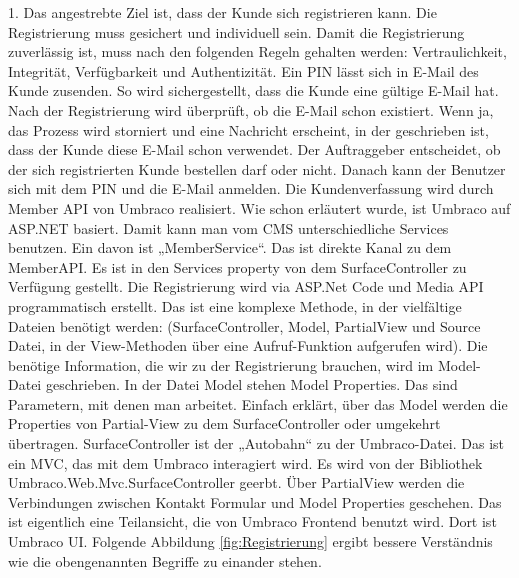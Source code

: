 1. Das angestrebte Ziel ist, dass der Kunde sich registrieren kann. Die Registrierung muss gesichert und individuell sein. Damit die Registrierung zuverlässig ist, muss nach den folgenden Regeln gehalten werden: Vertraulichkeit, Integrität, Verfügbarkeit und Authentizität.
Ein \ac{PIN} lässt sich in E-Mail des Kunde zusenden. So wird sichergestellt, dass die Kunde eine gültige E-Mail hat. Nach der Registrierung wird überprüft, ob die E-Mail schon existiert. Wenn ja, das Prozess wird storniert und eine Nachricht erscheint, in der geschrieben ist, dass der Kunde diese E-Mail schon verwendet. 
Der Auftraggeber entscheidet, ob der sich registrierten Kunde bestellen darf oder nicht. Danach kann der Benutzer sich mit dem PIN und die E-Mail anmelden. 
Die Kundenverfassung wird durch Member \ac{API} von Umbraco realisiert. 
Wie schon erläutert wurde, ist Umbraco auf ASP.NET basiert. Damit kann man vom CMS unterschiedliche Services benutzen. Ein davon ist „MemberService“. Das ist direkte Kanal zu dem MemberAPI. Es ist in den Services\cite{UmbracoHQ2018Services} property von dem SurfaceController \cite{UmbracoHQ2018SurfaceController} zu Verfügung gestellt. 
Die Registrierung wird via ASP.Net Code und Media API programmatisch erstellt. Das ist eine komplexe Methode, in der vielfältige Dateien benötigt werden: (SurfaceController, Model\cite{UmbracoHQ2018Models}, PartialView und Source Datei, in der View-Methoden über eine Aufruf-Funktion aufgerufen wird). Die benötige Information, die wir zu der Registrierung brauchen, wird im Model- Datei geschrieben. 
In der Datei Model stehen Model Properties. Das sind Parametern, mit denen man arbeitet. Einfach erklärt, über das Model werden die Properties von Partial-View zu dem SurfaceController oder umgekehrt übertragen.
SurfaceController ist der „Autobahn“ zu der Umbraco-Datei. Das ist ein \ac{MVC}, das mit dem Umbraco interagiert wird. Es wird von der Bibliothek Umbraco.Web.Mvc.SurfaceController geerbt. 
Über PartialView werden die Verbindungen zwischen Kontakt Formular und Model Properties geschehen. Das ist eigentlich eine Teilansicht, die von Umbraco Frontend benutzt wird. Dort ist Umbraco \ac{UI}. 
Folgende Abbildung \ref{fig:Registrierung} ergibt bessere Verständnis wie die obengenannten Begriffe zu einander stehen.

